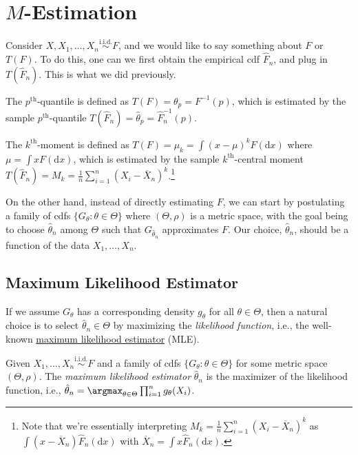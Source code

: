 \chapter{\(M\)-Estimation}
Consider \(X, X_1, \dots , X_n \overset{\text{i.i.d.} }{\sim } F\), and we would like to say something about \(F\) or \(T(F)\). To do this, one can we first obtain the empirical cdf \(\hat{F} _n\), and plug in \(T(\hat{F} _n)\). This is what we did previously.

\begin{eg}[Quantile]
	The \(p^{\text{th} }\)-quantile is defined as \(T(F) = \theta _p = F^{-1} (p)\), which is estimated by the sample \(p^{\text{th} }\)-quantile \(T(\hat{F} _n) = \hat{\theta} _p = \hat{F} _n ^{-1} (p)\).
\end{eg}

\begin{eg}[Moment]
	The \(k^{\text{th} }\)-moment is defined as \(T(F) = \mu _k = \int (x - \mu )^k F(\mathrm{d} x)\) where \(\mu = \int x F(\mathrm{d} x)\), which is estimated by the sample \(k^{\text{th} }\)-central moment \(T(\hat{F} _n) = M_k = \frac{1}{n} \sum_{i=1}^{n} (X_i - \overline{X} _n)^k\).\footnote{Note that we're essentially interpreting \(M_k = \frac{1}{n}\sum_{i=1}^{n} (X_i - \overline{X} _n)^k\) as \(\int (x - \overline{X} _n) \hat{F} _n(\mathrm{d} x)\) with \(\overline{X} _n = \int x \hat{F} _n(\mathrm{d} x)\).}
\end{eg}

On the other hand, instead of directly estimating \(F\), we can start by postulating a family of cdfs \(\{ G_\theta \colon \theta  \in \Theta \} \) where \((\Theta , \rho )\) is a metric space, with the goal being to choose \(\hat{\theta} _n\) among \(\Theta \) such that \(G_{\hat{\theta} _n}\) approximates \(F\). Our choice, \(\hat{\theta} _n\), should be a function of the data \(X_1, \dots , X_n\).

\section{Maximum Likelihood Estimator}
If we assume \(G_\theta \) has a corresponding density \(g_\theta \) for all \(\theta \in \Theta \), then a natural choice is to select \(\hat{\theta} _n \in \Theta \) by maximizing the \emph{likelihood function}, i.e., the well-known \hyperref[def:MLE]{maximum likelihood estimator} (MLE).

\begin{definition}\label{def:MLE}
	Given \(X_1, \dots , X_n \overset{\text{i.i.d.} }{\sim } F\) and a family of cdfs \(\{ G_\theta \colon \theta \in \Theta \} \) for some metric space \((\Theta , \rho )\). The \emph{maximum likelihood estimator} \(\hat{\theta} _n\) is the maximizer of the likelihood function, i.e., \(\hat{\theta} _n = \argmax_{\theta \in \Theta } \prod_{i=1}^{n} g_\theta (X_i)\).
\end{definition}

